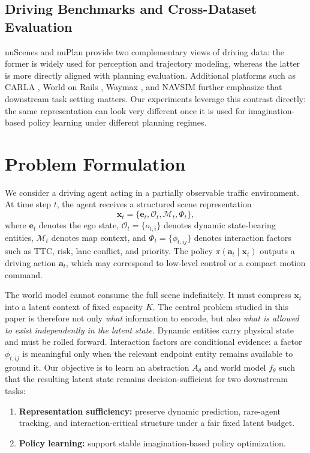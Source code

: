 \documentclass[journal]{IEEEtran}
\begin{document}
\subsection{Driving Benchmarks and Cross-Dataset Evaluation}
nuScenes \cite{caesar2020nuscenes} and nuPlan \cite{caesar2021nuplan} provide two complementary views of driving data: the former is widely used for perception and trajectory modeling, whereas the latter is more directly aligned with planning evaluation. Additional platforms such as CARLA \cite{dosovitskiy2017carla}, World on Rails \cite{chen2021worldonrails}, Waymax \cite{mao2023waymax}, and NAVSIM \cite{dauner2024navsim} further emphasize that downstream task setting matters. Our experiments leverage this contrast directly: the same representation can look very different once it is used for imagination-based policy learning under different planning regimes.

\section{Problem Formulation}
We consider a driving agent acting in a partially observable traffic environment. At time step $t$, the agent receives a structured scene representation
\begin{equation}
\mathbf{x}_t = \{\mathbf{e}_t, \mathcal{O}_t, \mathcal{M}_t, \Phi_t\},
\label{eq:state}
\end{equation}
where $\mathbf{e}_t$ denotes the ego state, $\mathcal{O}_t=\{o_{t,i}\}$ denotes dynamic state-bearing entities, $\mathcal{M}_t$ denotes map context, and $\Phi_t=\{\phi_{t,ij}\}$ denotes interaction factors such as TTC, risk, lane conflict, and priority. The policy $\pi(\mathbf{a}_t \mid \mathbf{x}_t)$ outputs a driving action $\mathbf{a}_t$, which may correspond to low-level control or a compact motion command.

The world model cannot consume the full scene indefinitely. It must compress $\mathbf{x}_t$ into a latent context of fixed capacity $K$. The central problem studied in this paper is therefore not only \emph{what} information to encode, but also \emph{what is allowed to exist independently in the latent state}. Dynamic entities carry physical state and must be rolled forward. Interaction factors are conditional evidence: a factor $\phi_{t,ij}$ is meaningful only when the relevant endpoint entity remains available to ground it. Our objective is to learn an abstraction $A_\theta$ and world model $f_\theta$ such that the resulting latent state remains decision-sufficient for two downstream tasks:
\begin{enumerate}
\item \textbf{Representation sufficiency:} preserve dynamic prediction, rare-agent tracking, and interaction-critical structure under a fair fixed latent budget.
\item \textbf{Policy learning:} support stable imagination-based policy optimization.
\end{enumerate}
\end{document}
